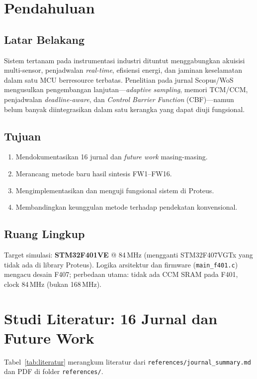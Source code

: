 \documentclass[12pt,a4paper]{article}
\begin{document}
\newpage
\tableofcontents
\newpage
\listoffigures
\newpage
\listoftables
\newpage

\section{Pendahuluan}
\subsection{Latar Belakang}
Sistem tertanam pada instrumentasi industri dituntut menggabungkan akuisisi multi-sensor, penjadwalan \textit{real-time}, efisiensi energi, dan jaminan keselamatan dalam satu MCU berresource terbatas. Penelitian pada jurnal Scopus/WoS mengusulkan pengembangan lanjutan---\textit{adaptive sampling}, memori TCM/CCM, penjadwalan \textit{deadline-aware}, dan \textit{Control Barrier Function} (CBF)---namun belum banyak diintegrasikan dalam satu kerangka yang dapat diuji fungsional.

\subsection{Tujuan}
\begin{enumerate}[label=\alph*.]
    \item Mendokumentasikan 16 jurnal dan \textit{future work} masing-masing.
    \item Merancang metode baru hasil sintesis FW1--FW16.
    \item Mengimplementasikan dan menguji fungsional sistem di Proteus.
    \item Membandingkan keunggulan metode terhadap pendekatan konvensional.
\end{enumerate}

\subsection{Ruang Lingkup}
Target simulasi: \textbf{STM32F401VE} @ 84\,MHz (mengganti STM32F407VGTx yang tidak ada di library Proteus). Logika arsitektur dan firmware (\texttt{main\_f401.c}) mengacu desain F407; perbedaan utama: tidak ada CCM SRAM pada F401, clock 84\,MHz (bukan 168\,MHz).

\section{Studi Literatur: 16 Jurnal dan Future Work}
Tabel~\ref{tab:literatur} merangkum literatur dari \texttt{references/journal\_summary.md} dan PDF di folder \texttt{references/}.
\end{document}
